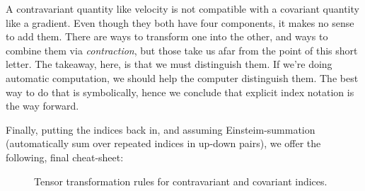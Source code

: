 \documentclass[no-fonts,nols]{tufte-handout}
\begin{document}
A contravariant quantity like velocity is not compatible with a covariant
quantity like a gradient. Even though they both have four components, it 
makes no sense to add them. There are ways to transform one into the other, 
and ways to combine them via \textit{contraction}, but those take us afar
from the point of this short letter. The takeaway, here, is that we must 
distinguish them. If we're doing automatic computation, we should help the
computer distinguish them. The best way to do that is symbolically, hence
we conclude that explicit index notation is the way forward.

Finally, putting the indices back in, and assuming Einsteim-summation
(automatically sum over repeated indices in up-down
pairs), we offer
	the following, final cheat-sheet:

\begin{figure}
  \centering
  \caption{Tensor transformation rules for 
           contravariant and covariant indices.}
  \label{fig:tensor_transform}
\end{figure}



\end{document}
